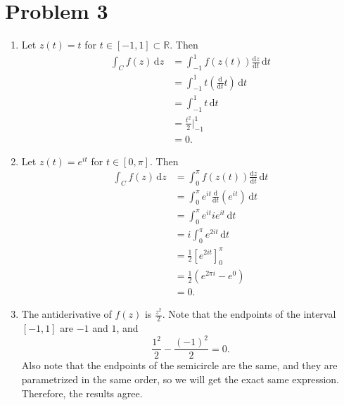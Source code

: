 \documentclass[11pt, letterpaper]{article}
\begin{document}
\section*{Problem 3}
\begin{enumerate}
	\item Let $z(t)=t$ for $t\in[-1,1]\subset \mathbb{R} $. Then
		\begin{align*}
			\int_C f(z) \,\mathrm{d} z&=\int_{-1}^{1} f(z(t))\frac{\mathrm{d}z}{\mathrm{d}t}  \,\mathrm{d} t\\
						  &=\int_{-1}^{1} t\left( \frac{\mathrm{d}}{\mathrm{d}t} t \right)  \,\mathrm{d} t\\
						  &=\int_{-1}^{1} t \,\mathrm{d} t\\
						  &=\frac{t^2}{2} \bigg|_{-1}^1\\
						  &=0
		.\end{align*}
	\item Let $z(t)=e^{it} $ for $t\in[0,\pi ]$. Then
		\begin{align*}
			\int_C f(z) \,\mathrm{d} z&=\int_{0}^{\pi } f(z(t)) \frac{\mathrm{d}z}{\mathrm{d}t}  \,\mathrm{d} t\\
						  &=\int_{0}^{\pi } e^{it} \frac{\mathrm{d}}{\mathrm{d}t} \left( e^{it}  \right)  \,\mathrm{d} t\\
						  &=\int_{0}^{\pi } e^{it} ie^{it}  \,\mathrm{d} t\\
						  &=i\int_{0}^{\pi } e^{2it}  \,\mathrm{d} t\\
						  &=\frac{1}{2} \left[ e^{2it}  \right]_{0}^{\pi }\\
						  &=\frac{1}{2} \left( e^{2\pi i} -e^{0}  \right) \\
						  &=0
		.\end{align*}
	\item The antiderivative of $f(z)$ is $\frac{z^2}{2} $. Note that the endpoints of the interval $[-1,1]$ are $-1$ and $1$, and
		\[
			\frac{1^2}{2} -\frac{(-1)^2}{2} =0
		.\]
		Also note that the endpoints of the semicircle are the same, and they are parametrized in the same order, so we will get the exact same expression. Therefore, the results agree.
\end{enumerate}
\end{document}
